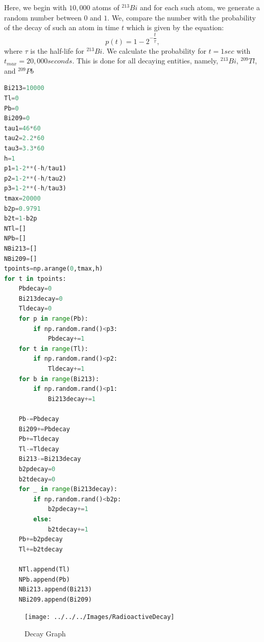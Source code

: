 \begin{center}


\end{center}
Here, we begin with $10,000$ atoms of $^{213}Bi$ and for each such atom, we generate a random number between $0$ and $1$. We, compare the number with the probability of the decay of such an atom in time $t$ which is given by the equation:
$$p(t)=1-2^{-\dfrac{t}{\tau}},
$$
where $\tau$ is the half-life for $^{213}Bi$. We calculate the probability for $t=1 sec$ with $t_{max}=20,000 seconds$. This is done for all decaying entities, namely, $^{213}Bi$, $^{209}Tl$,  and  $^{209}Pb$
\begin{lstlisting}[language=Python, caption=Decay Chain, frame=single, label={lst:decay} ]
Bi213=10000
Tl=0
Pb=0
Bi209=0
tau1=46*60
tau2=2.2*60
tau3=3.3*60
h=1
p1=1-2**(-h/tau1)
p2=1-2**(-h/tau2)
p3=1-2**(-h/tau3)
tmax=20000
b2p=0.9791
b2t=1-b2p
NTl=[]
NPb=[]
NBi213=[]
NBi209=[]
tpoints=np.arange(0,tmax,h)
for t in tpoints:
	Pbdecay=0
	Bi213decay=0
	Tldecay=0
	for p in range(Pb):
		if np.random.rand()<p3:
			Pbdecay+=1
	for t in range(Tl):
		if np.random.rand()<p2:
			Tldecay+=1
	for b in range(Bi213):
		if np.random.rand()<p1:
			Bi213decay+=1

	Pb-=Pbdecay
	Bi209+=Pbdecay
	Pb+=Tldecay
	Tl-=Tldecay
	Bi213-=Bi213decay
	b2pdecay=0
	b2tdecay=0
	for _ in range(Bi213decay):
		if np.random.rand()<b2p:
			b2pdecay+=1
		else:
			b2tdecay+=1
	Pb+=b2pdecay
	Tl+=b2tdecay

	NTl.append(Tl)
	NPb.append(Pb)
	NBi213.append(Bi213)
	NBi209.append(Bi209)


\end{lstlisting}
\begin{figure}[H]
	\centering
	\texttt{[image: ../../../Images/RadioactiveDecay]}
	\caption{Decay Graph}
	\label{fig:radioactivedecay}
\end{figure}
